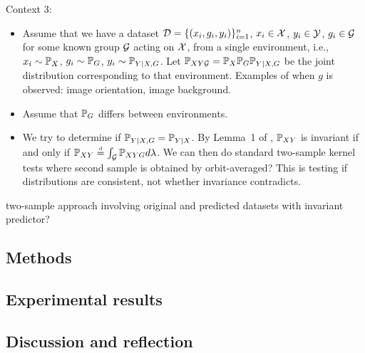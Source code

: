 Context 3:

\begin{itemize}

\item
Assume that we have a dataset $\mathcal{D}=\{(x_i,g_i,y_i)\}_{i=1}^n$, $x_i\in\mathcal{X}$, $y_i\in\mathcal{Y}$, $g_i\in\mathcal{G}$ for some known group $\mathcal{G}$ acting on $\mathcal{X}$, from a single environment, i.e., $x_i\sim\mathbb{P}_X$, $g_i\sim\mathbb{P}_G$, $y_i\sim\mathbb{P}_{Y|X,G}$. Let $\mathbb{P}_{XY\mathcal{G}}=\mathbb{P}_X\mathbb{P}_G\mathbb{P}_{Y|X,G}$ be the joint distribution corresponding to that environment. Examples of when $g$ is observed: image orientation, image background.

\item
Assume that $\mathbb{P}_G$ differs between environments.

\item
We try to determine if $\mathbb{P}_{Y|X,G}=\mathbb{P}_{Y|X}$. \todo By Lemma~1 of \parencite{Elesedy:2021}, $\mathbb{P}_{XY}$ is invariant if and only if $\mathbb{P}_{XY}\stackrel{\text{\rm\tiny d}}{=}\int_{\mathcal{G}} \mathbb{P}_{XYG}d\lambda$. We can then do standard two-sample kernel tests where second sample is obtained by orbit-averaged? \todo This is testing if distributions are consistent, not whether invariance contradicts.

\end{itemize}

\todo two-sample approach involving original and predicted datasets with invariant predictor?

\subsection{\todo Methods}

\subsection{\todo Experimental results}

\subsection{Discussion and reflection}